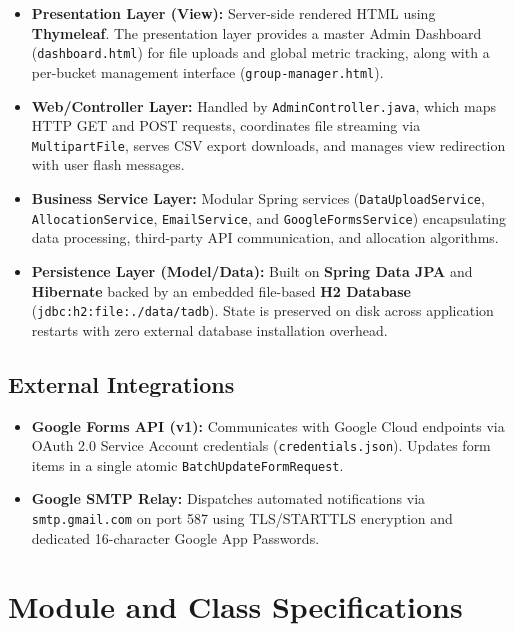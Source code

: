 \documentclass[12pt, a4paper]{article}
\begin{document}
\begin{itemize}
    \item \textbf{Presentation Layer (View):} Server-side rendered HTML using \textbf{Thymeleaf}. The presentation layer provides a master Admin Dashboard (\texttt{dashboard.html}) for file uploads and global metric tracking, along with a per-bucket management interface (\texttt{group-manager.html}).
    \item \textbf{Web/Controller Layer:} Handled by \texttt{AdminController.java}, which maps HTTP GET and POST requests, coordinates file streaming via \texttt{MultipartFile}, serves CSV export downloads, and manages view redirection with user flash messages.
    \item \textbf{Business Service Layer:} Modular Spring services (\texttt{DataUploadService}, \texttt{AllocationService}, \texttt{EmailService}, and \texttt{GoogleFormsService}) encapsulating data processing, third-party API communication, and allocation algorithms.
    \item \textbf{Persistence Layer (Model/Data):} Built on \textbf{Spring Data JPA} and \textbf{Hibernate} backed by an embedded file-based \textbf{H2 Database} (\texttt{jdbc:h2:file:./data/tadb}). State is preserved on disk across application restarts with zero external database installation overhead.
\end{itemize}

\subsection{External Integrations}
\begin{itemize}
    \item \textbf{Google Forms API (v1):} Communicates with Google Cloud endpoints via OAuth 2.0 Service Account credentials (\texttt{credentials.json}). Updates form items in a single atomic \texttt{BatchUpdateFormRequest}.
    \item \textbf{Google SMTP Relay:} Dispatches automated notifications via \texttt{smtp.gmail.com} on port 587 using TLS/STARTTLS encryption and dedicated 16-character Google App Passwords.
\end{itemize}

\section{Module and Class Specifications}
\end{document}
